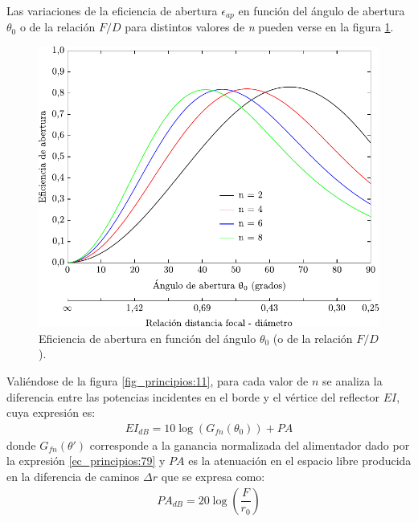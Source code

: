 Las variaciones de la eficiencia de abertura $\epsilon_{ap}$ en función del ángulo de abertura $\theta_0$ o de la relación $F/D$ para distintos valores de \emph{n} pueden verse en la figura \ref{fig_principios:10}.
\begin{figure}[H]
\centering
\includegraphics[scale = 0.98]{Figures/Principios/principios_10}
\caption{Eficiencia de abertura en función del ángulo $\theta_0$ (o de la relación $F/D$).}
\label{fig_principios:10}
\end{figure}
Valiéndose de la figura \ref{fig_principios:11}, para cada valor de $n$ se analiza la diferencia entre las potencias incidentes en el borde y el vértice del reflector $EI$, cuya expresión es:
\begin{align}
EI_{dB} = 10\log\left(G_{fn}\left(\theta_0\right)\right) + P\!A
\label{ec_principios:84}
\end{align}
donde $G_{fn}\left(\theta '\right)$ corresponde a la ganancia normalizada del alimentador dado por la expresión \eqref{ec_principios:79} y $P\!A$ es la atenuación en el espacio libre producida en la diferencia de caminos $\Delta r$ que se expresa como:
\begin{align}
P\!A_{dB} = 20\log\left(\dfrac{F}{r_0}\right)
\label{ec_principios:85}
\end{align}
